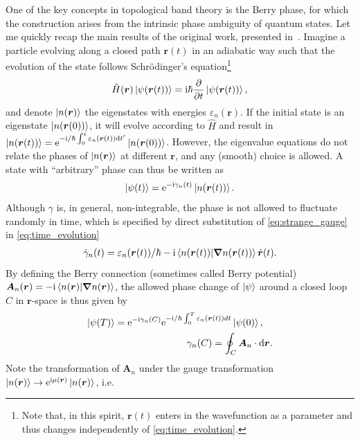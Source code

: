One of the key concepts in topological band theory is the Berry phase, for which the construction arises from the intrinsic phase ambiguity of quantum states.
Let me quickly recap the main results of the original work, presented in~\cite{Berry1984}.
Imagine a particle evolving along a closed path ${\bm r}(t)$ in an adiabatic way such that the evolution of the state follows Schrödinger's equation\footnote{Note that, in this spirit, $\bm r(t)$ enters in the wavefunction as a parameter and thus changes independently of \cref{eq:time_evolution}.}
\begin{align}
    \hat H(\bm r)\ket{\psi(\bm r(t))} = \mathrm i\hbar\frac{\partial}{\partial t}\ket{\psi({\bm r(t)})},
    \label{eq:time_evolution}
\end{align}
and denote $\ket{n(\bm r)}$ the eigenstates with energies $\varepsilon_n(\bm r)$.
If the initial state is an eigenstate $\ket{n(\bm r(0))}$, it will evolve according to $\hat H$ and result in $\ket{n(\bm r(t))}=\mathrm e^{-\mathrm i/\hbar\int_0^t \varepsilon_n(\bm r(t))\mathrm d t'}\ket{n(\bm r(0))}$.
However, the eigenvalue equations do not relate the phases of $\ket{n(\bm r)}$ at different $\bm r$, and any (smooth) choice is allowed.
A state with ``arbitrary'' phase can thus be written as
\begin{align}
    \ket{\psi(t)} = \mathrm e^{-\mathrm i\gamma_n(t)}\ket{n(\bm r(t))}.
    \label{eq:strange_gauge}
\end{align}
Although $\gamma$ is, in general, non-integrable, the phase is not allowed to fluctuate randomly in time, which is specified by direct substitution of \cref{eq:strange_gauge} in \cref{eq:time_evolution}
\begin{align}
    \dot\gamma_n(t) = \varepsilon_n(\bm r(t))/\hbar -\mathrm i \braket{n({\bm r(t)})|\bm\nabla n({\bm r(t)})} \dot{\bm r}(t).
    \label{eq:phase_evolution}
\end{align}
By defining the Berry connection (sometimes called Berry potential) $\bm A_n(\bm r) = -\mathrm i \braket{n(\bm r)|\bm\nabla n(\bm r)}$, the allowed phase change of $\ket\psi$ around a closed loop $C$ in $\bm r$-space is thus given by
\begin{align}
    \ket{\psi(T)} = \mathrm e^{-\mathrm i \gamma_n(C)}\mathrm e^{-\mathrm i/\hbar\int_0^T\varepsilon_n(\bm r(t))dt}\ket{\psi(0)}
    ,\quad
    \\
    \gamma_n(C) = \oint_C{\bm A_n}\cdot\mathrm d \bm r.
    \label{eq:phase_change}
\end{align}
Note the transformation of $\bm A_n$ under the gauge transformation $\ket{n(\bm r)}\rightarrow\mathrm e^{\mathrm i\mu(\bm r)}\ket{n(\bm r)}$, i.e.
